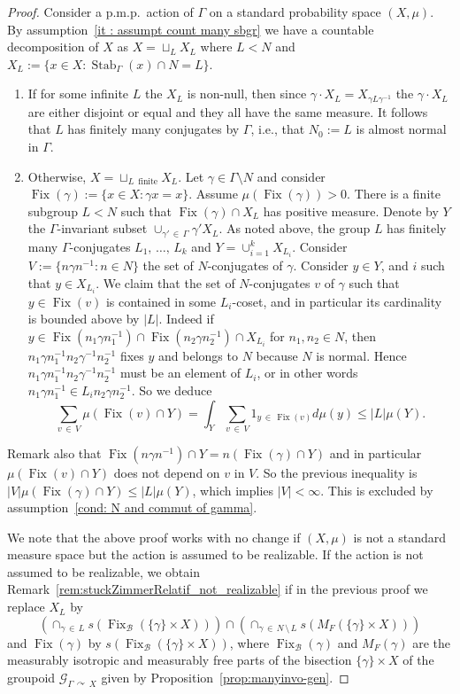 \documentclass[AHL,Unicode,longabstracts,published]{cedram}
\newcommand{\acting}{\curvearrowright}
\newcommand{\cg}{\mathcal{G}}
\newcommand{\rb}{\mathscr{B}}
\DeclareMathOperator{\Fix}{Fix}
\DeclareMathOperator{\Stab}{Stab}
\newcommand{\pmp}{p.m.p.\ }
\newcommand*{\romanenumi}{\renewcommand*{\theenumi}{\roman{enumi}}}
\begin{document}
\begin{proof}
Consider a \pmp action of $\Gamma$ on a standard probability space $(X,\mu)$. By assumption~\eqref{it : assumpt count many sbgr} we have a countable decomposition of $X$ as $X= \sqcup_{L} X_L$ where $L<N$ and $X_L:=\{x\in X: \Stab_{\Gamma}(x)\cap N=L\}$.
\begin{enumerate}\romanenumi
\item If for some infinite $L$ the $X_{L}$ is non-null, then since $\gamma\cdot X_L=X_{\gamma L \gamma^{-1}}$ the $\gamma\cdot X_L$ are either disjoint or equal and they all have the same measure. It follows that $L$ has finitely many conjugates by $\Gamma$, i.e., that $N_0:=L$ is almost normal in $\Gamma$.
\item Otherwise, $X = \sqcup_{L\,\text{ finite}} X_L$. Let $\gamma\in \Gamma\setminus N$ and consider $\Fix(\gamma):=\{x\in X: \gamma x=x\}$. Assume $\mu(\Fix(\gamma))>0$. There is a finite subgroup $L<N$ such that $\Fix(\gamma) \cap X_L$ has positive measure. Denote by $Y$ the $\Gamma$-invariant subset $\cup_{\gamma'\,\in\,\Gamma} \gamma' X_L$. As noted above, the group $L$ has finitely many $\Gamma$-conjugates $L_1,\,\dots,\,L_k$ and $Y=\cup_{i=1}^k X_{L_i}$. Consider $V := \{ n \gamma n^{-1} : n \in N\}$ the set of $N$-conjugates of $\gamma$. Consider $y \in Y$, and $i$ such that $y \in X_{L_i}$. We claim that the set of $N$-conjugates $v$ of $\gamma$ such that $y\in \Fix(v)$ is contained in some $L_i$-coset, and in particular its cardinality is bounded above by $|L|$. Indeed if $y\in \Fix(n_1 \gamma n_1^{-1})\cap \Fix(n_2 \gamma n_2^{-1})\cap X_{L_i}$ for $n_1,n_2 \in N$, then $n_1\gamma n_1^{-1}n_2\gamma^{-1}n_2^{-1}$ fixes $y$ and belongs to $N$ because $N$ is normal. Hence $n_1\gamma n_1^{-1}n_2\gamma^{-1}n_2^{-1}$ must be an element of $L_i$, or in other words $n_1\gamma n_1^{-1} \in L_i n_2\gamma n_2^{-1}$. So we deduce
\[
\sum_{v\,\in\,V} \mu\left(\Fix(v) \cap Y\right) = \int_Y \sum_{v\,\in\,V} 1_{y\,\in\,\Fix(v)} d\mu(y) \leq |L| \mu(Y).
\]
\end{enumerate}
Remark also that $\Fix(n\gamma n^{-1}) \cap Y=n(\Fix(\gamma) \cap Y)$ and in particular $\mu(\Fix(v)\cap Y)$ does not depend on $v$ in $V$. So the previous inequality is $|V| \mu(\Fix(\gamma) \cap Y) \leq |L| \mu(Y)$, which implies $|V|<\infty$. This is excluded by assumption~\eqref{cond: N and commut of gamma}.

We note that the above proof works with no change if $(X,\mu)$ is not a standard measure space but the action is assumed to be realizable. If the action is not assumed to be realizable, we obtain Remark~\ref{rem:stuckZimmerRelatif_not_realizable} if in the previous proof we replace $X_L$ by
\[
\left(\cap_{\gamma\,\in\,L} s\left(\Fix_{\rb}\left(\{\gamma\} \times X\right)\right)\right) \cap \left(\cap_{\gamma\,\in\,N\,\setminus\,L} s\left(M_F\left(\{\gamma\} \times X\right)\right)\right)
\]
and $\Fix(\gamma)$ by $s(\Fix_{\rb}(\{\gamma\}\times X))$, where $\Fix_{\rb}(\gamma)$ and $M_F(\gamma)$ are the measurably isotropic and measurably free parts of the bisection $\{\gamma\} \times X$ of the groupoid $\cg_{\Gamma\, \acting\,X}$ given by Proposition~\ref{prop:manyinvo-gen}.



\end{proof}
\end{document}
